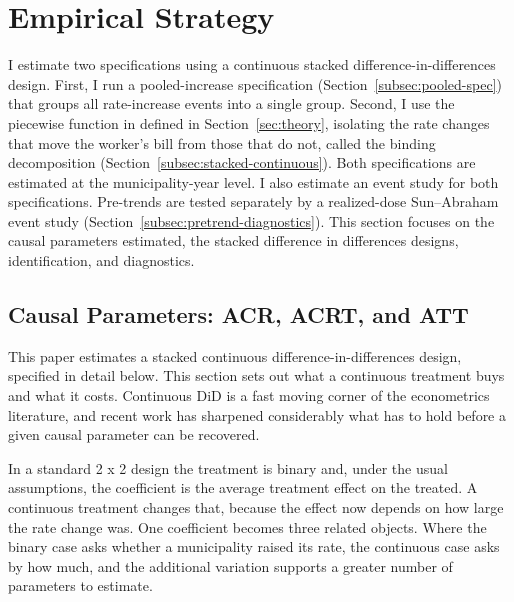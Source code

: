 \documentclass[12pt]{article}
\begin{document}
\section{Empirical Strategy}
\label{sec:strategy}

I estimate two specifications using a continuous stacked
difference-in-differences design. First, I run a pooled-increase specification (Section~\ref{subsec:pooled-spec}) that groups all
rate-increase events into a single
group. Second, I use the piecewise function in defined in
Section~\ref{sec:theory}, isolating the rate changes that move the
worker's bill from those that do not, called the binding
decomposition (Section~\ref{subsec:stacked-continuous}). Both specifications are
estimated at the municipality-year level. I also estimate an event study for both specifications. Pre-trends are tested
separately by a realized-dose Sun--Abraham event study
(Section~\ref{subsec:pretrend-diagnostics}). This section focuses on the causal parameters estimated,
the stacked difference in differences designs, identification, and diagnostics.


\subsection{Causal Parameters: ACR, ACRT, and ATT}
\label{subsec:causal-params}

This paper estimates a stacked continuous difference-in-differences
design, specified in detail below. This section sets out what a
continuous treatment buys and what it costs. Continuous DiD is a fast
moving corner of the econometrics literature, and recent work has
sharpened considerably what has to hold before a given causal parameter
can be recovered.

In a standard 2 x 2 design the treatment is binary and, under the
usual assumptions, the coefficient is the average treatment effect on the
treated. A continuous treatment changes that, because the effect now
depends on how large the rate change was. One coefficient becomes three
related objects. Where the binary case asks whether a municipality
raised its rate, the continuous case asks by how much, and the additional
variation supports a greater number of parameters to estimate.
\end{document}
